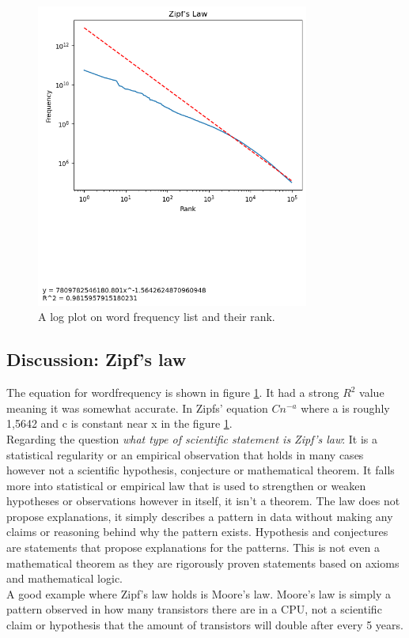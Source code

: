 \documentclass[a4paper,11pt]{article}
\begin{document}
\begin{figure}[h]
    \centering
    \includegraphics[width=0.8\textwidth]{graph.png}
    \caption{A log plot on word frequency list and their rank.}
    \label{fig:word-freq-log}
\end{figure}

\subsection{Discussion: Zipf's law}
The equation for wordfrequency is shown in figure \ref{fig:word-freq-log}. It had a strong $R^2$ value meaning it was somewhat accurate. In Zipfs' equation $Cn^{-a}$ where a is roughly 1,5642 and c is constant near x in the figure \ref{fig:word-freq-log}.\\
Regarding the question \textit{what type of scientific statement is Zipf's law}: It is a statistical regularity or an empirical observation that holds in many cases however not a scientific hypothesis, conjecture or mathematical theorem. It falls more into statistical or empirical law that is used to strengthen or weaken hypotheses or observations however in itself, it isn't a theorem. The law does not propose explanations, it simply describes a pattern in data without making any claims or reasoning behind why the pattern exists. Hypothesis and conjectures are statements that propose explanations for the patterns. This is not even a mathematical theorem as they are rigorously proven statements based on axioms and mathematical logic. \\
A good example where Zipf's law holds is Moore's law. Moore's law is simply a pattern observed in how many transistors there are in a CPU, not a scientific claim or hypothesis that the amount of transistors will double after every 5 years. 





\printbibliography
\end{document}

